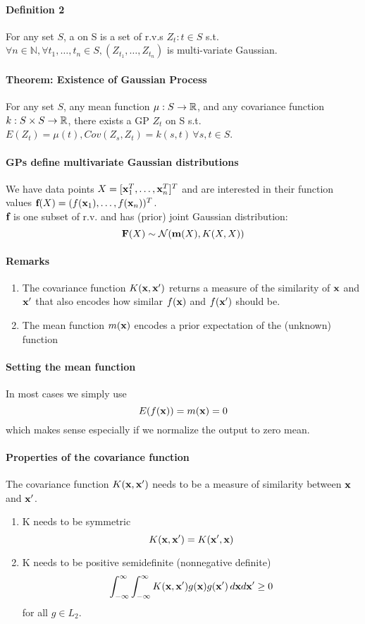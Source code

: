 \documentclass[11pt]{article}
\begin{document}
\paragraph{Definition 2}
For any set $S$, a  on S is a set of r.v.s $Z_t: t\in S$ s.t. $\forall n \in \mathbb{N}, \forall t_1,\hdots,t_n \in S, (Z_{t_1},\hdots, Z_{t_n})$ is multi-variate Gaussian.
\paragraph{Theorem: Existence of Gaussian Process}
For any set $S$, any mean function $\mu: S \rightarrow \mathbb{R}$, and any covariance function $k: S\times S \rightarrow \mathbb{R}$, there exists a GP $Z_t$ on S s.t. $E(Z_t) = \mu(t), Cov(Z_s, Z_t) = k(s,t) \, \forall s, t\in S$.

\paragraph{GPs define multivariate Gaussian distributions}
We have data points $X = [\textbf{x}_1^T, \hdots, \textbf{x}_n^T]^T$ and are interested in their function values $\textbf{f}(X) = (f(\textbf{x}_1), \hdots, f(\textbf{x}_n))^T$.\\
$\textbf{f}$ is one subset of r.v. and has (prior) joint Gaussian distribution:
$$\textbf{F}(X) \sim \mathcal{N}(\textbf{m}(X),K(X,X))$$
\paragraph{Remarks}
\begin{enumerate}
	\item The covariance function $K(\textbf{x}, \textbf{x}')$ returns a measure of the similarity of $\textbf{x}$ and $\textbf{x}'$ that also encodes how similar $f(\textbf{x})$ and $f(\textbf{x}')$ should be.
	\item The mean function $m(\textbf{x})$ encodes a prior expectation of the (unknown) function
\end{enumerate}

\paragraph{Setting the mean function}
In most cases we simply use
$$E(f(\textbf{x})) = m(\textbf{x}) = 0$$
which makes sense especially if we normalize the output to zero mean.
\paragraph{Properties of the covariance function}
The covariance function $K(\textbf{x},\textbf{x}')$ needs to be a measure of similarity between $\textbf{x}$ and $\textbf{x}'$.
\begin{enumerate}
	\item K needs to be symmetric $$K(\textbf{x}, \textbf{x}') = K(\textbf{x}', \textbf{x})$$
	\item K needs to be positive semidefinite (nonnegative definite) $$\int_{-\infty}^\infty\int_{-\infty}^{\infty} K(\textbf{x}, \textbf{x}')g(\textbf{x})g(\textbf{x}')\,d\textbf{x} d\textbf{x}' \geq 0$$ for all $g \in L_2$.
\end{enumerate}
\end{document}
